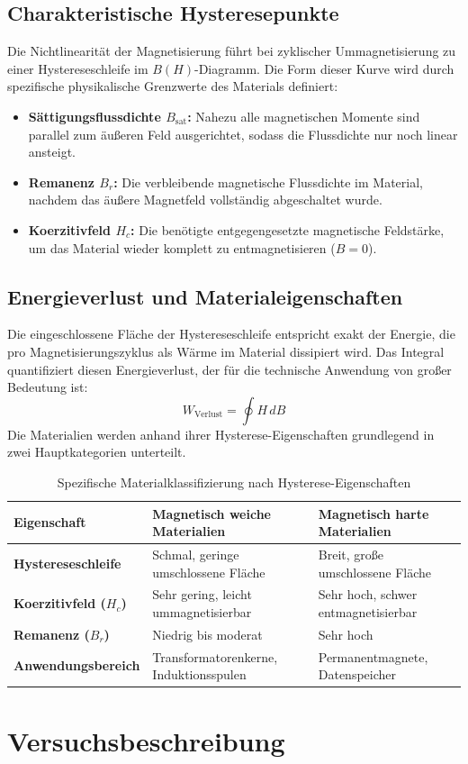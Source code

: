 \documentclass[11pt,a4paper]{article}
\numberwithin{equation}{section}
\begin{document}
\subsection{Charakteristische Hysteresepunkte}
Die Nichtlinearität der Magnetisierung führt bei zyklischer Ummagnetisierung zu einer Hystereseschleife im \(B(H)\)-Diagramm. Die Form dieser Kurve wird durch spezifische physikalische Grenzwerte des Materials definiert:
\begin{itemize}
    \item \textbf{Sättigungsflussdichte \(B_{\text{sat}}\):} Nahezu alle magnetischen Momente sind parallel zum äußeren Feld ausgerichtet, sodass die Flussdichte nur noch linear ansteigt.
    \item \textbf{Remanenz \(B_r\):} Die verbleibende magnetische Flussdichte im Material, nachdem das äußere Magnetfeld vollständig abgeschaltet wurde.
    \item \textbf{Koerzitivfeld \(H_c\):} Die benötigte entgegengesetzte magnetische Feldstärke, um das Material wieder komplett zu entmagnetisieren (\(B = 0\)).
\end{itemize}

\subsection{Energieverlust und Materialeigenschaften}
Die eingeschlossene Fläche der Hystereseschleife entspricht exakt der Energie, die pro Magnetisierungszyklus als Wärme im Material dissipiert wird. Das Integral quantifiziert diesen Energieverlust, der für die technische Anwendung von großer Bedeutung ist:
\begin{equation}
    W_{\text{Verlust}} = \oint H \, dB
\end{equation}
Die Materialien werden anhand ihrer Hysterese-Eigenschaften grundlegend in zwei Hauptkategorien unterteilt.

\begin{table}[htbp]
    \centering
    \caption{Spezifische Materialklassifizierung nach Hysterese-Eigenschaften}
    \renewcommand{\arraystretch}{1.3}
    \begin{tabular}{p{3.5cm} p{5.5cm} p{5.5cm}}
        \hline
        \textbf{Eigenschaft} & \textbf{Magnetisch weiche Materialien} & \textbf{Magnetisch harte Materialien} \\
        \hline
        \textbf{Hystereseschleife} & Schmal, geringe umschlossene Fläche & Breit, große umschlossene Fläche \\
        \textbf{Koerzitivfeld (\(H_c\))} & Sehr gering, leicht ummagnetisierbar & Sehr hoch, schwer entmagnetisierbar \\
        \textbf{Remanenz (\(B_r\))} & Niedrig bis moderat & Sehr hoch \\
        \textbf{Anwendungsbereich} & Transformatorenkerne, Induktionsspulen & Permanentmagnete, Datenspeicher \\
        \hline
    \end{tabular}
    \label{tab:material_klassifizierung}
\end{table}

\section{Versuchsbeschreibung}
\end{document}
